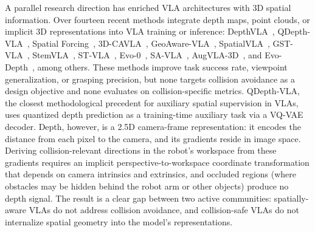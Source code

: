 A parallel research direction has enriched VLA architectures with 3D spatial information. Over fourteen recent methods integrate depth maps, point clouds, or implicit 3D representations into VLA training or inference: DepthVLA~\cite{depthvla2025}, QDepth-VLA~\cite{li2025qdepth}, Spatial Forcing~\cite{li2025spatialforcing}, 3D-CAVLA~\cite{3dcavla2025}, GeoAware-VLA~\cite{geoaware2025}, SpatialVLA~\cite{spatialvla2025}, GST-VLA~\cite{gstvla2026}, StemVLA~\cite{stemvla2026}, ST-VLA~\cite{stvla2026}, Evo-0~\cite{evo02025}, SA-VLA~\cite{savla2026}, AugVLA-3D~\cite{augvla3d2026}, and Evo-Depth~\cite{evodepth2026}, among others. These methods improve task success rate, viewpoint generalization, or grasping precision, but none targets collision avoidance as a design objective and none evaluates on collision-specific metrics. QDepth-VLA, the closest methodological precedent for auxiliary spatial supervision in VLAs, uses quantized depth prediction as a training-time auxiliary task via a VQ-VAE decoder. Depth, however, is a 2.5D camera-frame representation: it encodes the distance from each pixel to the camera, and its gradients reside in image space. Deriving collision-relevant directions in the robot's workspace from these gradients requires an implicit perspective-to-workspace coordinate transformation that depends on camera intrinsics and extrinsics, and occluded regions (where obstacles may be hidden behind the robot arm or other objects) produce no depth signal. The result is a clear gap between two active communities: spatially-aware VLAs do not address collision avoidance, and collision-safe VLAs do not internalize spatial geometry into the model's representations.

